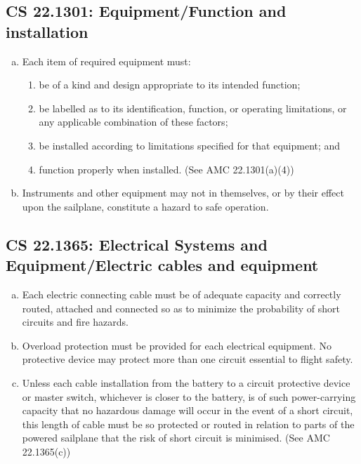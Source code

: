 \documentclass{article}
\begin{document}
\subsection[CS 22.1301]{CS 22.1301:  Equipment/Function and installation}
\begin{enumerate}[(a)]
\item Each item of required equipment must:
	\begin{enumerate}[(1)]
          \item be of a kind and design appropriate to its intended function;
          \item be labelled as to its identification, function, or operating limitations, or any applicable combination of these factors;
          \item be installed according to limitations specified for that equipment; and
          \item function properly when installed. (See AMC 22.1301(a)(4))
	\end{enumerate}
\item Instruments and other equipment may not in themselves, or by their effect upon the sailplane, constitute a hazard to safe operation.
\end{enumerate}


\subsection[CS 22.1365]{CS 22.1365:  Electrical Systems and Equipment/Electric cables and equipment}
\begin{enumerate}[(a)] 
\item Each electric connecting cable must be of adequate capacity and correctly routed, attached and connected so as to minimize the probability of short circuits and fire hazards.
\item Overload protection must be provided for each electrical equipment. No protective device may protect more than one circuit essential to flight safety.
\item Unless each cable installation from the battery to a circuit protective device or master switch, whichever is closer to the battery, is of such power-carrying capacity that no hazardous damage will occur in the event of a short circuit, this length of cable must be so protected or routed in relation to parts of the powered sailplane that the risk of short circuit is minimised. (See AMC 22.1365(c))
\end{enumerate}
\end{document}
